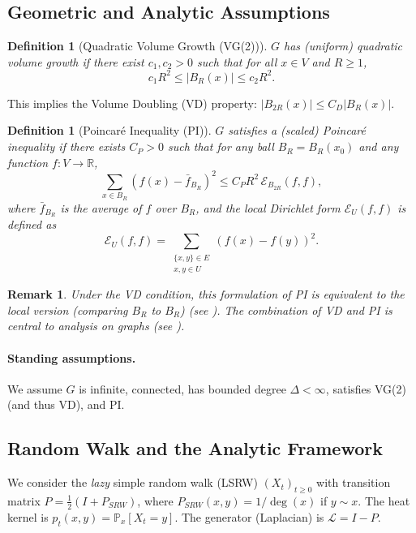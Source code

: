 \documentclass[11pt]{article}
\numberwithin{equation}{section}
\newtheorem{definition}[theorem]{Definition}
\newtheorem{remark}[theorem]{Remark}
\newcommand{\cE}{\mathcal{E}}
\newcommand{\LL}{\mathcal{L}}
\newcommand{\R}{\mathbb{R}}
\newcommand{\Prob}{\mathbb{P}}
\begin{document}
\subsection{Geometric and Analytic Assumptions}

\begin{definition}[Quadratic Volume Growth (VG(2))]
$G$ has (uniform) quadratic volume growth if there exist $c_1, c_2 > 0$ such that for all $x \in V$ and $R \geq 1$,
\begin{equation}\label{eq:quad}
c_1 R^{2} \leq |B_R(x)| \leq c_2 R^{2}.
\end{equation}
\end{definition}
This implies the Volume Doubling (VD) property: $|B_{2R}(x)| \leq C_D |B_R(x)|$.

\begin{definition}[Poincaré Inequality (PI)]\label{def:PI}
$G$ satisfies a (scaled) Poincaré inequality if there exists $C_P > 0$ such that for any ball $B_R=B_R(x_0)$ and any function $f: V \to \R$,
\[
\sum_{x \in B_R} (f(x) - \bar{f}_{B_R})^2 \leq C_P R^2 \, \cE_{B_{2R}}(f,f),
\]
where $\bar{f}_{B_R}$ is the average of $f$ over $B_R$, and the local Dirichlet form $\cE_U(f,f)$ is defined as
\[
\cE_U(f,f) = \sum_{\substack{\{x,y\} \in E \\ x,y \in U}} (f(x)-f(y))^2.
\]
\end{definition}

\begin{remark}\label{rem:PI_equivalence}
Under the VD condition, this formulation of PI is equivalent to the local version (comparing $B_R$ to $B_R$) (see \cite{HajlaszKoskela00}). The combination of VD and PI is central to analysis on graphs (see \cite{GrigoryanTelcs12}).
\end{remark}

\paragraph{Standing assumptions.} We assume $G$ is infinite, connected, has bounded degree $\Delta < \infty$, satisfies VG(2) (and thus VD), and PI.

\subsection{Random Walk and the Analytic Framework}
We consider the \emph{lazy} simple random walk (LSRW) $(X_t)_{t \geq 0}$ with transition matrix $P = \frac{1}{2}(I + P_{SRW})$, where $P_{SRW}(x,y) = 1/\deg(x)$ if $y \sim x$. The heat kernel is $p_t(x,y) = \Prob_x[X_t = y]$. The generator (Laplacian) is $\LL = I - P$.
\end{document}
